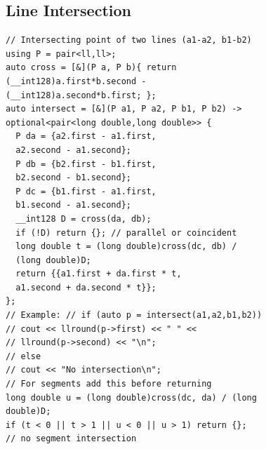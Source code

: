 \subsection{Line Intersection}
\begin{verbatim}
// Intersecting point of two lines (a1-a2, b1-b2)
using P = pair<ll,ll>;
auto cross = [&](P a, P b){ return
(__int128)a.first*b.second -
(__int128)a.second*b.first; };
auto intersect = [&](P a1, P a2, P b1, P b2) ->
optional<pair<long double,long double>> {
  P da = {a2.first - a1.first,
  a2.second - a1.second};
  P db = {b2.first - b1.first,
  b2.second - b1.second};
  P dc = {b1.first - a1.first,
  b1.second - a1.second};
  __int128 D = cross(da, db);
  if (!D) return {}; // parallel or coincident
  long double t = (long double)cross(dc, db) /
  (long double)D;
  return {{a1.first + da.first * t,
  a1.second + da.second * t}};
};
// Example: // if (auto p = intersect(a1,a2,b1,b2))
// cout << llround(p->first) << " " <<
// llround(p->second) << "\n";
// else
// cout << "No intersection\n";
// For segments add this before returning
long double u = (long double)cross(dc, da) / (long
double)D;
if (t < 0 || t > 1 || u < 0 || u > 1) return {};
// no segment intersection
\end{verbatim}

